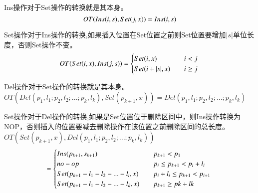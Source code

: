 \par Ins操作对于Set操作的转换就是其本身。\\
\begin{equation}
OT(Ins(i,s),Set(j,x))= Ins(i,s)\\
\end{equation}

\par Set操作对于Ins操作的转换,如果插入位置在Set位置之前则Set位置要增加$|s|$单位长度，否则Set操作不变。\\
\begin{equation}
OT(Set(i,x),Ins(j,s))= \begin{cases}
{Set(i,x)}  \quad & i<j \\
{Set(i+|s|,x)} \quad  &i \ge j \end{cases} \\
\end{equation}

\par Del操作对于Set操作的转换就是其本身。\\
$OT(Del(p_1,l_1;p_2,l_2;...;p_k,l_k),Set(p_{k+1},x)) = Del(p_1,l_1;p_2,l_2;...;p_k,l_k)$\\

\par Set操作对于Del操作的转换,如果是Set位置位于删除区间中，则Ins操作转换为NOP，否则插入的位置要减去删除操作在该位置之前删除区间的总长度。\\
$OT(Set(p_{k+1},x),Del(p_1,l_1;p_2,l_2;...;p_k,l_k))$
\begin{equation}
= \begin{cases}
Ins(p_{k+1},s_{k+1}) \quad & p_{k+1} < p_1 \\
no-op \quad & p_i \le p_{k+1} < p_i+l_i\\
Set(p_{k+1}-l_1-l_2-...-l_i,x) \quad & p_i+l_i \le p_{k+1} < p_{i+1}\\
Set(p_{k+1}-l_1-l_2-...-l_k,x) \quad & p_{k+1} \ge pk+lk \end{cases}\\
\end{equation}